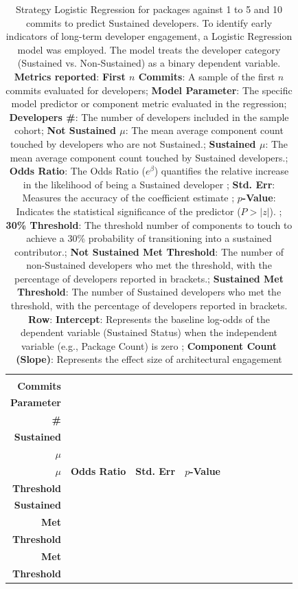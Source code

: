 \begin{landscape}
\begin{table}[H]
\centering
\setlength{\tabcolsep}{2pt}
\caption[Strategy Logistic Regression Sustained for packages for 1 to 5 and 10]{Strategy Logistic Regression for packages against 1 to 5 and 10 commits to predict Sustained developers. 
    To identify early indicators of long-term developer engagement, a Logistic Regression model was employed. The model treats the developer category (Sustained vs. Non-Sustained) as a binary dependent variable. \\ \textbf{Metrics reported}:   \textbf{First $n$ Commits}: A sample of the first $n$ commits evaluated for developers;  \textbf{Model Parameter}: The specific model predictor or component metric evaluated in the regression;  \textbf{Developers \#}: The number of developers included in the sample cohort;  \textbf{Not Sustained $\mu$}: The mean average component count touched by developers who are not Sustained.;  \textbf{Sustained $\mu$}: The mean average component count touched by Sustained developers.;  \textbf{Odds Ratio}: The Odds Ratio ($e^\beta$) quantifies the relative increase in the likelihood of being a Sustained developer ;  \textbf{Std. Err}: Measures the accuracy of the coefficient estimate ;  \textbf{$p$-Value}: Indicates the statistical significance of the predictor ($P > |z|$). ;  \textbf{30\% Threshold}: The threshold number of components to touch to achieve a 30\% probability of transitioning into a sustained contributor.;  \textbf{Not Sustained Met Threshold}: The number of non-Sustained developers who met the threshold, with the percentage of developers reported in brackets.;  \textbf{Sustained Met Threshold}: The number of Sustained developers who met the threshold, with the percentage of developers reported in brackets.
\\ \textbf{Row}:   \textbf{Intercept}: Represents the baseline log-odds of the dependent variable (Sustained Status) when the independent variable (e.g., Package Count) is zero ;  \textbf{Component Count (Slope)}: Represents the effect size of architectural engagement 
}
\begin{tabular}{r l r r r r r r r r r}
\toprule
\makecell[t]{\textbf{First $n$}\\\textbf{Commits}} & \makecell[t]{\textbf{Model}\\\textbf{Parameter}} & \makecell[t]{\textbf{Developers}\\\textbf{\#}} & \makecell[t]{\textbf{Not}\\\textbf{Sustained}\\\textbf{$\mu$}} & \makecell[t]{\textbf{Sustained}\\\textbf{$\mu$}} & \textbf{Odds Ratio} & \textbf{Std. Err} & \textbf{$p$-Value} & \makecell[t]{\textbf{30\%}\\\textbf{Threshold}} & \makecell[t]{\textbf{Not}\\\textbf{Sustained}\\\textbf{Met}\\\textbf{Threshold}} & \makecell[t]{\textbf{Sustained}\\\textbf{Met}\\\textbf{Threshold}} \\ 

\end{tabular}
\end{table}
\end{landscape}
